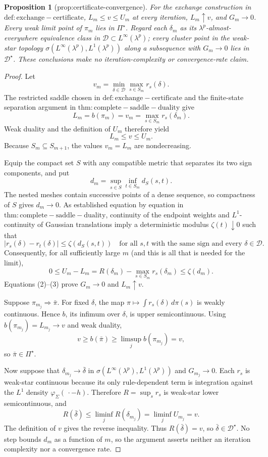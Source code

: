 \documentclass{article}
\newtheorem{proposition}{Proposition}
\begin{document}
\begin{proposition}[prop:certificate-convergence]\label{prop:certificate-convergence}
For the exchange construction in \(\mathrm{def:exchange-certificate}\), \(L_m\le v\le U_m\) at every iteration, \(L_m\uparrow v\), and \(G_m\to0\). Every weak limit point of \(\pi_m\) lies in \(\Pi^{\star}\). Regard each \(\delta_m\) as its \(\lambda^p\)-almost-everywhere equivalence class in \(\mathcal D\subset L^{\infty}(\lambda^p)\); every cluster point in the weak-star topology \(\sigma(L^{\infty}(\lambda^p),L^1(\lambda^p))\) along a subsequence with \(G_m\to0\) lies in \(\mathcal D^{\star}\). These conclusions make no iteration-complexity or convergence-rate claim.
\end{proposition}
\begin{proof}
Let
\[
 v_m=\min_{\delta\in\mathcal D}\max_{s\in S_m}r_s(\delta).
\]
The restricted saddle chosen in \(\mathrm{def:exchange-certificate}\) and the finite-state separation argument in \(\mathrm{thm:complete-saddle-duality}\) give
\[
 L_m=b(\pi_m)=v_m=\max_{s\in S_m}r_s(\delta_m). \tag{1}
\]
Weak duality and the definition of \(U_m\) therefore yield
\[
 L_m\leq v\leq U_m. \tag{2}
\]
Because \(S_m\subseteq S_{m+1}\), the values \(v_m=L_m\) are nondecreasing.

Equip the compact set \(S\) with any compatible metric that separates its two sign components, and put
\[
 d_m=\sup_{s\in S}\inf_{t\in S_m}d_S(s,t).
\]
The nested meshes contain successive points of a dense sequence, so compactness of \(S\) gives \(d_m\to0\). As established equation by equation in \(\mathrm{thm:complete-saddle-duality}\), continuity of the endpoint weights and \(L^1\)-continuity of Gaussian translations imply a deterministic modulus \(\zeta(t)\downarrow0\) such that
\[
 |r_s(\delta)-r_t(\delta)|\leq\zeta(d_S(s,t))
 \quad\text{for all }s,t\text{ with the same sign and every }\delta\in\mathcal D.
\]
Consequently, for all sufficiently large \(m\) (and this is all that is needed for the limit),
\[
 0\leq U_m-L_m
 =R(\delta_m)-\max_{s\in S_m}r_s(\delta_m)
 \leq\zeta(d_m). \tag{3}
\]
Equations (2)--(3) prove \(G_m\to0\) and \(L_m\uparrow v\).

Suppose \(\pi_{m_j}\Rightarrow\bar\pi\). For fixed \(\delta\), the map \(\pi\mapsto\int r_s(\delta)\,d\pi(s)\) is weakly continuous. Hence \(b\), its infimum over \(\delta\), is upper semicontinuous. Using \(b(\pi_{m_j})=L_{m_j}\to v\) and weak duality,
\[
 v\geq b(\bar\pi)\geq\limsup_j b(\pi_{m_j})=v,
\]
so \(\bar\pi\in\Pi^{\star}\).

Now suppose that \(\delta_{m_j}\to\bar\delta\) in \(\sigma(L^{\infty}(\lambda^p),L^1(\lambda^p))\) and \(G_{m_j}\to0\). Each \(r_s\) is weak-star continuous because its only rule-dependent term is integration against the \(L^1\) density \(\varphi_{\Sigma}(\,\cdot-h)\). Therefore \(R=\sup_s r_s\) is weak-star lower semicontinuous, and
\[
 R(\bar\delta)\leq\liminf_jR(\delta_{m_j})
 =\liminf_jU_{m_j}=v.
\]
The definition of \(v\) gives the reverse inequality. Thus \(R(\bar\delta)=v\), so \(\bar\delta\in\mathcal D^{\star}\). No step bounds \(d_m\) as a function of \(m\), so the argument asserts neither an iteration complexity nor a convergence rate.
\end{proof}
\end{document}

